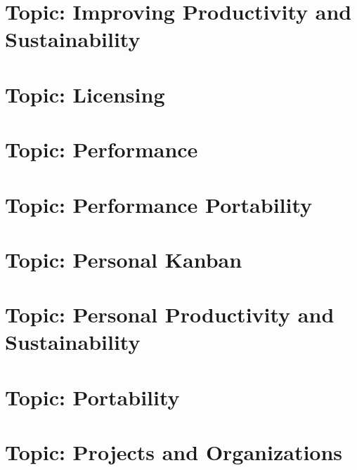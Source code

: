\documentclass[twoside]{book}
\newcommand{\+}{\discretionary{\mbox{\scriptsize$\hookleftarrow$}}{}{}}
\begin{document}
\chapter{Topic\+: Improving Productivity and Sustainability}
\label{md_markdown_topic_improving_productivity_and_sustanability}

\chapter{Topic\+: Licensing}
\label{md_markdown_topic_licensing}

\chapter{Topic\+: Performance}
\label{md_markdown_topic_performance}

\chapter{Topic\+: Performance Portability}
\label{md_markdown_topic_performance_portability}

\chapter{Topic\+: Personal Kanban}
\label{md_markdown_topic_personal_kanban}

\chapter{Topic\+: Personal Productivity and Sustainability}
\label{md_markdown_topic_personal_productivity_and_sustainability}

\chapter{Topic\+: Portability}
\label{md_markdown_topic_portability}

\chapter{Topic\+: Projects and Organizations}
\label{md_markdown_topic_projects_and_organizations}

\end{document}

